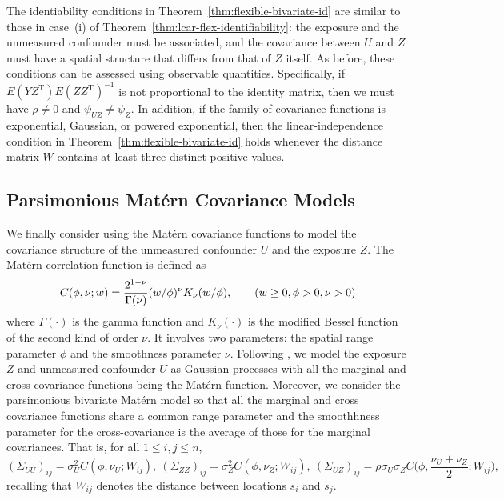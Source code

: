 \documentclass[11pt]{article}
\theoremstyle{definition}
\theoremstyle{remark}
\def\top{{ \mathrm{\scriptscriptstyle T} }}
\begin{document}
The identiability conditions in Theorem~\ref{thm:flexible-bivariate-id} are similar to those in case~(i) of Theorem~\ref{thm:lcar-flex-identifiability}: the exposure and the unmeasured confounder must be associated, and the covariance between $U$ and $Z$ must have a spatial structure that differs from that of $Z$ itself. As before, these  conditions can be assessed using observable quantities. Specifically, if
$
E(YZ^\top)E(ZZ^\top)^{-1}
$
is not proportional to the identity matrix, then we must have $\rho \neq 0$ and $\psi_{UZ} \neq \psi_Z$. In addition, if the family of covariance functions is exponential, Gaussian, or powered exponential, then the linear-independence condition in Theorem~\ref{thm:flexible-bivariate-id} holds whenever the distance matrix $W$ contains at least three distinct positive values.





\subsection{Parsimonious Mat\'ern Covariance Models}\label{sec:matern}



We finally consider using the Mat\'ern covariance functions to model the covariance structure of the unmeasured confounder $U$ and the exposure $Z$.  
The Mat\'ern correlation function is defined as
\[ C(\phi, \nu; w)
= 
{2^{1-\nu}\over \Gamma(\nu)}(w/\phi)^\nu K_\nu(w/\phi), 
\qquad (w \ge 0, \phi > 0, \nu >0)
\]
where $\Gamma(\cdot)$ is the gamma function and $K_\nu(\cdot)$ is the modified Bessel function of the second kind of order $\nu$. 
It involves two parameters: 
the spatial range parameter $\phi$ 
and the smoothness parameter $\nu$. 
 Following \citet{gneiting2010matern}, 
we model the exposure $Z$ and unmeasured confounder $U$ as Gaussian processes with 
all the marginal and cross covariance functions being the Mat\'ern function. 
Moreover, we consider the parsimonious bivariate Mat\'ern model 
so that all the marginal and cross covariance functions share a common range parameter and the smoothhness parameter for the cross-covariance is the average of those for the marginal covariances. 
That is, for all $1\le i, j \le n$, 
\begin{equation}\label{eq:pars-matern}
(\Sigma_{UU})_{ij} = \sigma_U^2 C(\phi, \nu_U; W_{ij}), 
\ 
(\Sigma_{ZZ})_{ij} = \sigma_Z^2 C(\phi, \nu_Z; W_{ij}), 
\ 
(\Sigma_{UZ})_{ij} = \rho \sigma_U \sigma_Z C \Big( \phi, \frac{\nu_U+\nu_Z}{2}; W_{ij} \Big), 
\end{equation}  
recalling that $W_{ij}$ denotes the distance between locations $s_i$ and $s_j$. 
\end{document}
